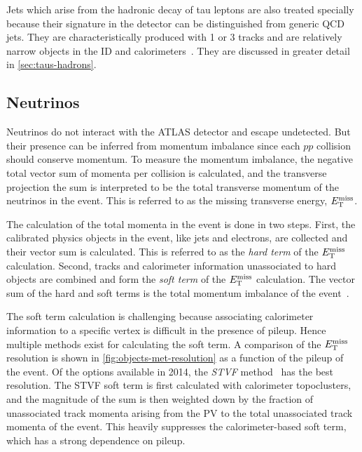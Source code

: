 Jets which arise from the hadronic decay of tau leptons are also treated specially because their signature in the detector can be distinguished from generic QCD jets. They are characteristically produced with 1 or 3 tracks and are relatively narrow objects in the ID and calorimeters~\cite{PERF-2013-06}. They are discussed in greater detail in \cref{sec:taus-hadrons}.

\subsection{Neutrinos}
\label{sec:neutrinos}

Neutrinos do not interact with the ATLAS detector and escape undetected. But their presence can be inferred from momentum imbalance since each $pp$ collision should conserve momentum. To measure the momentum imbalance, the negative total vector sum of momenta per collision is calculated, and the transverse projection the sum is interpreted to be the total transverse momentum of the neutrinos in the event. This is referred to as the missing transverse energy, $E_{\mathrm{T}}^{\mathrm{miss}}$.

The calculation of the total momenta in the event is done in two steps. First, the calibrated physics objects in the event, like jets and electrons, are collected and their vector sum is calculated. This is referred to as the \textit{hard term} of the $E_{\mathrm{T}}^{\mathrm{miss}}$ calculation. Second, tracks and calorimeter information unassociated to hard objects are combined and form the \textit{soft term} of the $E_{\mathrm{T}}^{\mathrm{miss}}$ calculation. The vector sum of the hard and soft terms is the total momentum imbalance of the event~\cite{PERF-2011-07}.

The soft term calculation is challenging because associating calorimeter information to a specific vertex is difficult in the presence of pileup. Hence multiple methods exist for calculating the soft term. A comparison of the $E_{\mathrm{T}}^{\mathrm{miss}}$ resolution is shown in \cref{fig:objects-met-resolution} as a function of the pileup of the event. Of the options available in 2014, the \textit{STVF} method~\cite{ATLAS-CONF-2014-019} has the best resolution. The STVF soft term is first calculated with calorimeter topoclusters, and the magnitude of the sum is then weighted down by the fraction of unassociated track momenta arising from the PV to the total unassociated track momenta of the event. This heavily suppresses the calorimeter-based soft term, which has a strong dependence on pileup.

